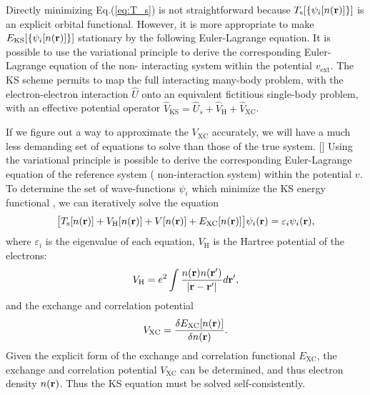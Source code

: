 Directly minimizing Eq.\thinspace(\ref{eq:T_s}) is not straightforward because $T_\text{s}[\{\psi_i[n({\bf r})]\}]$ 
is an explicit orbital functional. However, it is more appropriate to
make $E_{\text{KS}} [\{\psi_i [n({\bf r})]\}]$ stationary by the following Euler-Lagrange equation.
It is possible to use the variational principle to derive the corresponding Euler-Lagrange equation of
the non- interacting system within the potential $v_{\text{ext}}$.
The KS scheme permits to map the full interacting many-body problem, with the electron-electron interaction $\hat U$
onto an equivalent fictitious single-body problem, with an effective potential operator 
$\hat V_{\text{KS}}=\hat U_s + \hat V_{\text{H}} + \hat V_{\text{XC}}$.

If we figure out a way to approximate the $V_{\text{XC}}$ accurately, we will have a much less demanding set of equations 
to solve than those of the true system. [\cite{Burke07}]
Using the variational principle is possible to derive the corresponding Euler-Lagrange equation of the  reference system (
non-interaction system) within the potential $v$.
To determine the set of wave-functions $\psi_i$ which minimize the KS energy functional , we can iteratively solve the equation
\begin{align}
  \bigl[T_\text{s}[n({\bf {r}})] +V_\text{H}[n({\bf{r}})] +V[n({\bf{r}})]+E_{\text{XC}}[n({\bf{r}})] \bigr]\psi_i({\bf{r}})=\varepsilon_i\psi_i({\bf{r}}), \label{eq:KSE}
\end{align}
where $\varepsilon_i$ is the eigenvalue of each equation, $V_\text{H}$ is the Hartree potential of the electrons:
\begin{align}
 V_{\text H} = e^2 \int\frac{n({\bf r})n({\bf r}') }{|{\bf r}- {\bf r}'|}d{\bf r} ',
 \end{align}
and the exchange and correlation potential
 \begin{align}
 V_{\text {XC}} = \frac{\delta E_{\text{XC}}[n({\bf r})]} {\delta n({\bf r}) }.
 \end{align}
Given the explicit form of the exchange and correlation functional $E_{\text{XC}}$, the exchange and correlation potential $V_{\text {XC}}$ can be determined, and thus electron density $n({\bf r})$. Thus the KS equation must be solved self-consistently.


